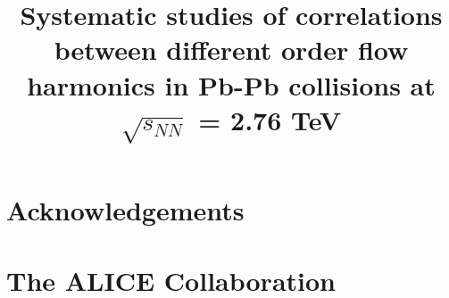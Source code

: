 \documentclass[ALICE,manyauthors]{cernphprep}
\begin{document}
%
%
\newcommand{\PbPb}{\textnormal{Pb-Pb}}
\newcommand{\AuAu}{\textnormal{Au--Au}}
\newcommand{\tn}[1]{\textnormal{#1}}
\newcommand{\snn}{\ensuremath{\sqrt{s_{NN}}}}
\newcommand{\chisqndf}{\chi^2/N_{\rm dof}}
\newcommand{\CKBNOTE}[1]{{\bf CKB:  #1}} 
\renewcommand{\CKBNOTE}[1]{}  %

\newcommand{\RHNOTE}[1]{{\bf RH:  #1}} 
\renewcommand{\RHNOTE}[1]{}  %
\newcommand{\multfigsize}{0.95}
\begin{titlepage}
%
%
%
\title{Systematic studies of correlations between different order flow harmonics in Pb-Pb collisions at $\sqrt{s_{NN}}$ = 2.76 TeV}

%
%
\begin{abstract}

\end{abstract}
\end{titlepage}
\setcounter{page}{2}


\newenvironment{acknowledgement}{\relax}{\relax}
\begin{acknowledgement}
\section*{Acknowledgements}
\end{acknowledgement}



%


\clearpage
\newpage


\section{The ALICE Collaboration}
\label{app:collab}
%
\end{document}
